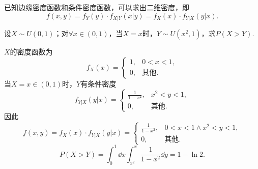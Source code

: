 \begin{corollary}
已知边缘密度函数和条件密度函数，可以求出二维密度，即\[
	f(x,y) = f_Y(y) \cdot f_{X \vert Y}(x \vert y)
	= f_X(x) \cdot f_{Y \vert X}(y \vert x).
\]
\end{corollary}

\begin{example}
设\(X \sim U(0,1)\)；对\(\forall x\in(0,1)\)，当\(X=x\)时，\(Y \sim U(x^2,1)\)，求\(P(X > Y)\).
\begin{solution}
\(X\)的密度函数为\[
f_X(x) = \left\{ \begin{array}{cl}
1, & 0<x<1, \\
0, & \text{其他}.
\end{array} \right.
\]当\(X=x\in(0,1)\)时，\(Y\)有条件密度\[
f_{Y \vert X}(y \vert x)
= \left\{ \begin{array}{cl}
\frac{1}{1-x^2}, & x^2<y<1, \\
0, & \text{其他}.
\end{array} \right.
\]因此\[
f(x,y) = f_X(x) \cdot f_{Y \vert X}(y \vert x)
= \left\{ \begin{array}{cl}
\frac{1}{1-x^2}, & 0<x<1 \land x^2<y<1, \\
0, & \text{其他}.
\end{array} \right.
\]\[
P(X > Y)
= \int_0^1 \dd{x} \int_{x^2}^x \frac{1}{1-x^2} \dd{y}
= 1 - \ln2.
\]
\end{solution}
\end{example}
